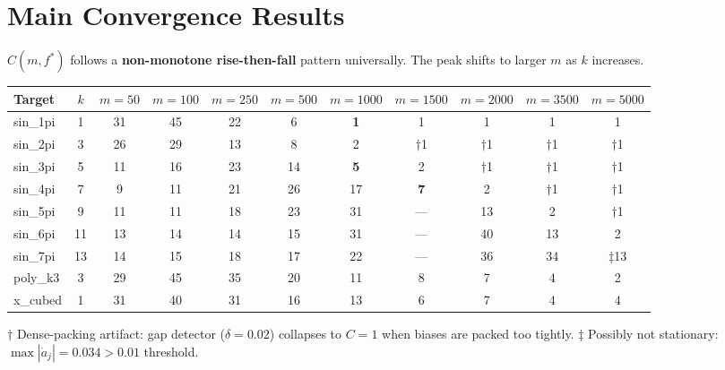\documentclass[11pt, letterpaper]{article}
\begin{document}
\section*{Main Convergence Results}

$C(m,f^*)$ follows a \textbf{non-monotone rise-then-fall} pattern universally. The peak
shifts to larger $m$ as $k$ increases.

\begin{center}
\small
\begin{tabular}{lc|ccccccccc}
\toprule
Target & $k$ & $m{=}50$ & $m{=}100$ & $m{=}250$ & $m{=}500$ & $m{=}1000$ & $m{=}1500$ & $m{=}2000$ & $m{=}3500$ & $m{=}5000$ \\
\midrule
sin\_1pi & 1  & 31 & 45 & 22 & 6  & \textbf{1}  & 1  & 1  & 1  & 1  \\
sin\_2pi & 3  & 26 & 29 & 13 & 8  & 2  & $\dagger$1 & $\dagger$1 & $\dagger$1 & $\dagger$1 \\
sin\_3pi & 5  & 11 & 16 & 23 & 14 & \textbf{5}  & 2  & $\dagger$1 & $\dagger$1 & $\dagger$1 \\
sin\_4pi & 7  & 9  & 11 & 21 & 26 & 17 & \textbf{7}  & 2  & $\dagger$1 & $\dagger$1 \\
sin\_5pi & 9  & 11 & 11 & 18 & 23 & 31 & --- & 13 & 2  & $\dagger$1 \\
sin\_6pi & 11 & 13 & 14 & 14 & 15 & 31 & --- & 40 & 13 & 2  \\
sin\_7pi & 13 & 14 & 15 & 18 & 17 & 22 & --- & 36 & 34 & $\ddagger$13 \\
poly\_k3 & 3  & 29 & 45 & 35 & 20 & 11 & 8  & 7  & 4  & 2  \\
x\_cubed & 1  & 31 & 40 & 31 & 16 & 13 & 6  & 7  & 4  & 4  \\
\bottomrule
\end{tabular}
\end{center}

{\small $\dagger$ Dense-packing artifact: gap detector ($\delta=0.02$) collapses to $C=1$
when biases are packed too tightly. \quad
$\ddagger$ Possibly not stationary: $\max|\dot{a}_j|=0.034 > 0.01$ threshold.}
\end{document}
